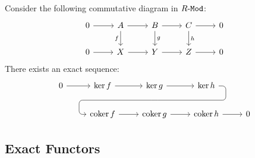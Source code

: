 \begin{lemma}
\label{lem:snake-lemma}
Consider the following commutative diagram in \({R\text{-}\texttt{Mod}}\):
\[
\begin{tikzcd}
0 \ar[r]
&A \ar[d, "f"'] \ar[r]
&B \ar[r] \ar[d, "g"]
&C \ar[r] \ar[d, "h"]
&0
\\
0 \ar[r]
&X \ar[r]
&Y \ar[r]
&Z \ar[r]
&0
\end{tikzcd}
\]
There exists an exact sequence:
\[
\begin{tikzcd}
0 \ar[r]
&\ker f \ar[r]
&\ker g \ar[r]
\ar[d, phantom, ""{coordinate, name=Z}]
&\ker h
\ar[
  dll,
  rounded corners,
  to path={ -- ([xshift=2ex]\tikztostart.east)
  |- (Z) [near end]\tikztonodes
  -| ([xshift=-2ex]\tikztotarget.west)
  -- (\tikztotarget)}
]
\\
&\coker f \ar[r]
&\coker g \ar[r]
&\coker h \ar[r]
&0
\end{tikzcd}
\]
\end{lemma}

\subsection{Exact Functors}

